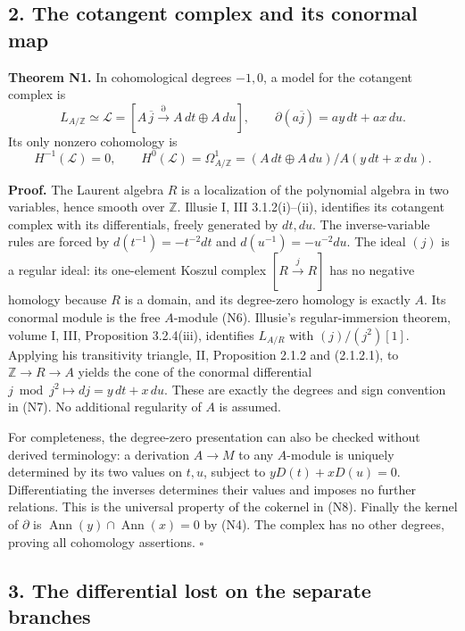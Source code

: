 \documentclass[
]{article}
\begin{document}
\subsection{2. The cotangent complex and its conormal
map}\label{the-cotangent-complex-and-its-conormal-map}

\textbf{Theorem N1.} In cohomological degrees \(-1,0\), a model for the
cotangent complex is \[
L_{A/\mathbb Z}\simeq
\mathcal L=\left[A\,\overline j
\xrightarrow{\partial}A\,dt\oplus A\,du\right],
\qquad \partial(a\overline j)=ay\,dt+ax\,du.
\tag{N7}
\] Its only nonzero cohomology is \[
H^{-1}(\mathcal L)=0,\qquad
H^0(\mathcal L)=\Omega^1_{A/\mathbb Z}
=(A\,dt\oplus A\,du)/A(y\,dt+x\,du).
\tag{N8}
\]

\textbf{Proof.} The Laurent algebra \(R\) is a localization of the
polynomial algebra in two variables, hence smooth over \(\mathbb Z\).
Illusie I, III 3.1.2(i)--(ii), identifies its cotangent complex with its
differentials, freely generated by \(dt,du\). The inverse-variable rules
are forced by \(d(t^{-1})=-t^{-2}dt\) and \(d(u^{-1})=-u^{-2}du\). The
ideal \((j)\) is a regular ideal: its one-element Koszul complex
\([R\xrightarrow{j}R]\) has no negative homology because \(R\) is a
domain, and its degree-zero homology is exactly \(A\). Its conormal
module is the free \(A\)-module (N6). Illusie's regular-immersion
theorem, volume I, III, Proposition 3.2.4(iii), identifies \(L_{A/R}\)
with \((j)/(j^2)[1]\). Applying his transitivity triangle, II,
Proposition 2.1.2 and (2.1.2.1), to \(\mathbb Z\to R\to A\) yields the
cone of the conormal differential \(j\bmod j^2\mapsto dj=y\,dt+x\,du\).
These are exactly the degrees and sign convention in (N7). No additional
regularity of \(A\) is assumed.

For completeness, the degree-zero presentation can also be checked
without derived terminology: a derivation \(A\to M\) to any \(A\)-module
is uniquely determined by its two values on \(t,u\), subject to
\(yD(t)+xD(u)=0\). Differentiating the inverses determines their values
and imposes no further relations. This is the universal property of the
cokernel in (N8). Finally the kernel of \(\partial\) is
\(\operatorname{Ann}(y)\cap\operatorname{Ann}(x)=0\) by (N4). The
complex has no other degrees, proving all cohomology assertions.
\(\square\)

\subsection{3. The differential lost on the separate
branches}\label{the-differential-lost-on-the-separate-branches}
\end{document}

